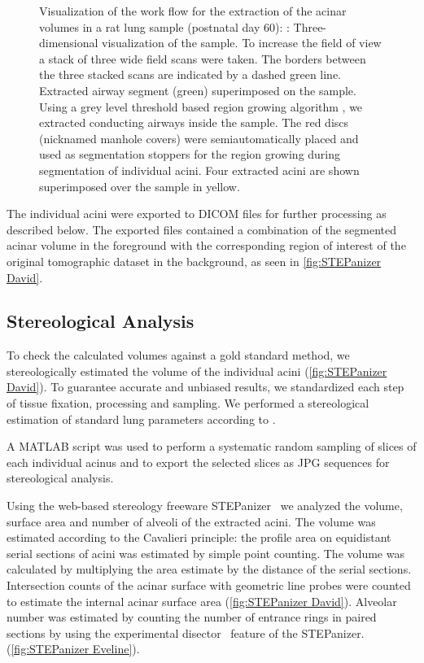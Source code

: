 \documentclass[paper=a4,DIV=calc,abstract,english]{scrartcl}
\newlength\imagescale		%
\begin{document}
\begin{figure}
{\begin{tikzpicture}[x=\imagescale,y=-\imagescale]
		\end{tikzpicture}%
		\label{subfig:extracted acini}%
		}%
	\caption{%
		Visualization of the work flow for the extraction of the acinar volumes in a rat lung sample (postnatal day 60): %
		\protect{}: Three-dimensional visualization of the sample.
		To increase the field of view a stack of three wide field scans were taken.
		The borders between the three stacked scans are indicated by a dashed green line.
		\protect{} Extracted airway segment (green) superimposed on the sample.
		Using a grey level threshold based region growing algorithm , we extracted conducting airways inside the sample.
		The red discs (nicknamed manhole covers) were semiautomatically placed and used as segmentation stoppers for the region growing during segmentation of individual acini.
		\protect{} Four extracted acini are shown superimposed over the sample in yellow.
	}
	\label{fig:workflow}
\end{figure}

The individual acini were exported to DICOM files for further processing as described below.
The exported files contained a combination of the segmented acinar volume in the foreground with the corresponding region of interest of the original tomographic dataset in the background, as seen in \autoref{fig:STEPanizer David}.

\subsection{Stereological Analysis}
\label{sec:stereological analysis}
To check the calculated volumes against a gold standard method, we stereologically estimated the volume of the individual acini (\autoref{fig:STEPanizer David}).
To guarantee accurate and unbiased results, we standardized each step of tissue fixation, processing and sampling. We performed a stereological estimation of standard lung parameters according to \citet{Hsia2010}.

A MATLAB script was used to perform a systematic random sampling of slices of each individual acinus and to export the selected slices as JPG sequences for stereological analysis.

Using the web-based stereology freeware STEPanizer~\cite[\url{http://stepanizer.com}]{Tschanz2011} we analyzed the volume, surface area and number of alveoli of the extracted acini.
The volume was estimated according to the Cavalieri principle: the profile area on equidistant serial sections of acini was estimated by simple point counting.
The volume was calculated by multiplying the area estimate by the distance of the serial sections.
Intersection counts of the acinar surface with geometric line probes were counted to estimate the internal acinar surface area (\autoref{fig:STEPanizer David}).
Alveolar number was estimated by counting the number of entrance rings in paired sections by using the experimental disector~\citep{Sterio1984} feature of the STEPanizer. (\autoref{fig:STEPanizer Eveline}).
\end{document}
